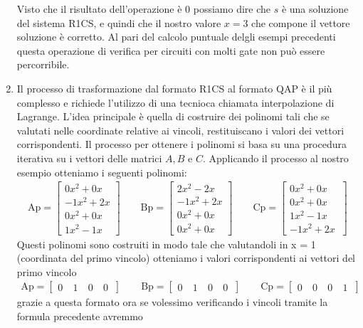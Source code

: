 \begin{enumerate}
    Visto che il risultato dell'operazione è 0 possiamo dire che $s$ è una soluzione del sistema R1CS, e quindi che il
    nostro valore $x=3$ che compone il vettore soluzione è corretto. Al pari del calcolo puntuale delgli esempi
    precedenti questa operazione di verifica per circuiti con molti gate non può essere percorribile.

    \item  Il processo di trasformazione dal formato R1CS al formato QAP è il più complesso e richiede l'utilizzo di una
    tecnioca chiamata interpolazione di Lagrange. L'idea principale è quella di costruire dei polinomi tali che se
    valutati nelle coordinate relative ai vincoli, restituiscano i valori dei vettori corrispondenti. Il processo per
    ottenere i polinomi si basa su una procedura iterativa su i vettori delle matrici $A,B$ e $C$. 
    Applicando il processo al nostro esempio otteniamo i seguenti polinomi:
    \begin{gather*}
        \text{Ap} =
        \begin{bmatrix}
        0x^2+0x \\
        -1x^2+2x \\
        0x^2+0x \\
        1x^2-1x \
        \end{bmatrix}
        \qquad
        \text{Bp} =
        \begin{bmatrix}
        2x^2-2x \\
        -1x^2+2x \\
        0x^2+0x \\
        0x^2+0x \
        \end{bmatrix}
        \qquad
        \text{Cp} =
        \begin{bmatrix}
        0x^2+0x \\
        0x^2+0x \\
        1x^2-1x \\
        -1x^2+2x \
        \end{bmatrix}
    \end{gather*}    
    Questi polinomi sono costruiti in modo tale che valutandoli in x = 1 (coordinata del primo vincolo) otteniamo i valori corrispondenti ai vettori del
    primo vincolo
    \begin{gather*}
        \text{Ap} =
        \begin{bmatrix}
        0&\
        1&\
        0&\
        0\
        \end{bmatrix}
        \qquad
        \text{Bp} =
        \begin{bmatrix}
        0&\
        1&\
        0&\
        0\
        \end{bmatrix}
        \qquad
        \text{Cp} =
        \begin{bmatrix}
        0&\
        0&\
        0&\
        1\
        \end{bmatrix}
    \end{gather*}
    grazie a questa formato ora se volessimo verificando i vincoli tramite la formula precedente avremmo
    

\end{enumerate}
